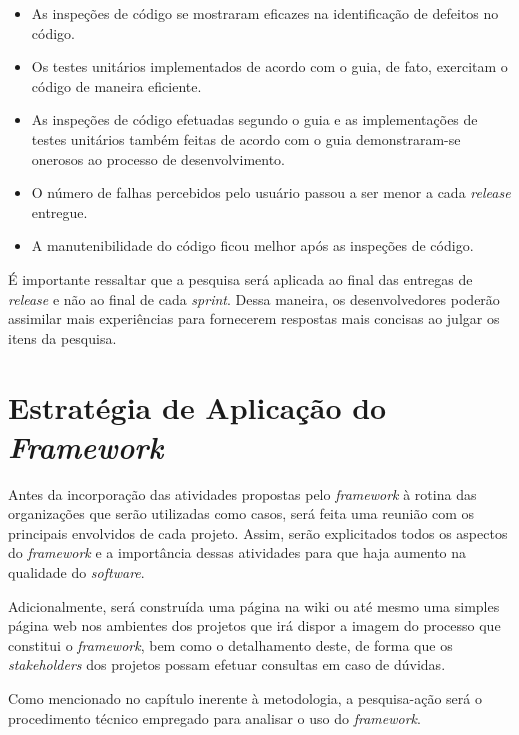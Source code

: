 \begin{itemize}
	\item As inspeções de código se mostraram eficazes na identificação de defeitos no código.

	\item Os testes unitários implementados de acordo com o guia, de fato, exercitam o código de maneira eficiente.

	\item As inspeções de código efetuadas segundo o guia e as implementações de testes unitários também feitas de acordo com o guia demonstraram-se onerosos ao processo de desenvolvimento.

	\item O número de falhas percebidos pelo usuário passou a ser menor a cada \textit{release} entregue.

	\item A manutenibilidade do código ficou melhor após as inspeções de código.
\end{itemize}

É importante ressaltar que a pesquisa será aplicada ao final das entregas de \textit{release} e não ao final de cada \textit{sprint}. Dessa maneira, os desenvolvedores poderão assimilar mais experiências para fornecerem respostas mais concisas ao julgar os itens da pesquisa.

\section{Estratégia de Aplicação do \textit{Framework}}

Antes da incorporação das atividades propostas pelo \textit{framework} à rotina das organizações que serão utilizadas como casos, será feita uma reunião com os principais envolvidos de cada projeto. Assim, serão explicitados todos os aspectos do \textit{framework} e a importância dessas atividades para que haja aumento na qualidade do \textit{software}.

Adicionalmente, será construída uma página na wiki ou até mesmo uma simples página web nos ambientes dos projetos que irá dispor a imagem do processo que constitui o \textit{framework}, bem como o detalhamento deste, de forma que os \textit{stakeholders} dos projetos possam efetuar consultas em caso de dúvidas.

Como mencionado no capítulo inerente à metodologia, a pesquisa-ação será o procedimento técnico empregado para analisar o uso do \textit{framework}.


